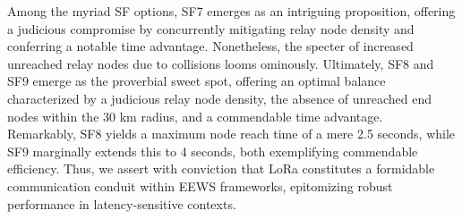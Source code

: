 Among the myriad SF options, SF7 emerges as an intriguing proposition, offering a judicious compromise by concurrently mitigating relay node density and conferring a notable time advantage. Nonetheless, the specter of increased unreached relay nodes due to collisions looms ominously. Ultimately, SF8 and SF9 emerge as the proverbial sweet spot, offering an optimal balance characterized by a judicious relay node density, the absence of unreached end nodes within the 30 km radius, and a commendable time advantage.\\

Remarkably, SF8 yields a maximum node reach time of a mere 2.5 seconds, while SF9 marginally extends this to 4 seconds, both exemplifying commendable efficiency. Thus, we assert with conviction that LoRa constitutes a formidable communication conduit within EEWS frameworks, epitomizing robust performance in latency-sensitive contexts. 




